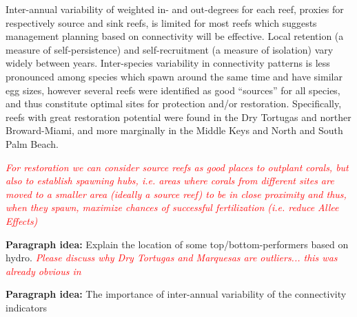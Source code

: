\documentclass[preprint,12pt,authoryear]{elsarticle}
\newcommand{\emphc}[1]{\emph{\textcolor{red}{#1}}}
\begin{document}
Inter-annual variability of weighted in- and out-degrees for each reef, proxies for respectively source and sink reefs, is limited for most reefs which suggests management planning based on connectivity will be effective. Local retention (a measure of self-persistence) and  self-recruitment (a measure of isolation) vary widely between years. Inter-species variability in connectivity patterns is less pronounced among species which spawn around the same time and have similar egg sizes, however several reefs were identified as good “sources” for all species, and thus constitute optimal sites for protection and/or restoration. Specifically, reefs with great restoration potential were found in the Dry Tortugas and norther Broward-Miami, and more marginally in the Middle Keys and North and South Palm Beach.

\emphc{For restoration we can consider source reefs as good places to outplant corals, but also to establish spawning hubs, i.e. areas where corals from different sites are moved to a smaller area (ideally a source reef) to be in close proximity and thus, when they spawn, maximize chances of successful fertilization (i.e. reduce Allee Effects)}

\textbf{Paragraph idea:} Explain the location of some top/bottom-performers based on hydro. \emphc{Please discuss why Dry Tortugas and Marquesas are outliers... this was already obvious in \cite{king2023larval}}

\textbf{Paragraph idea:} The importance of inter-annual variability of the connectivity indicators
\end{document}
